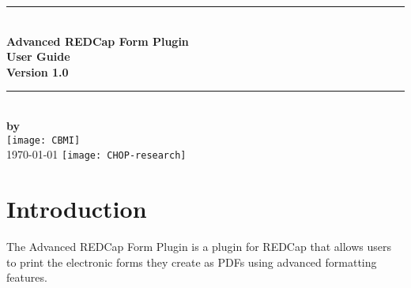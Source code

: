 \documentclass[12pt]{article}
\newcommand{\HRule}{\rule{\linewidth}{0.5mm}}
\begin{document}
\begin{titlepage}
\begin{center} 
\vspace*{\fill}
\HRule \\[0.4cm]
{\huge \bfseries Advanced REDCap Form Plugin} \\
{\huge \bfseries User Guide} \\[1.0cm]
{\huge \bfseries Version 1.0} \\[0.4cm]
\HRule \\[1.5cm]

{\large \bfseries by} \\
\texttt{[image: CBMI]} \\[5.0cm]
{\LARGE \today}
\vspace*{\fill}
\vfill
\texttt{[image: CHOP-research]} 
\end{center}
\end{titlepage}

\tableofcontents
\listoffigures
\newpage

\section{Introduction}
The Advanced REDCap Form Plugin is a plugin for REDCap that allows users to print the electronic forms they create as PDFs using advanced formatting features. 
    
\end{document}

